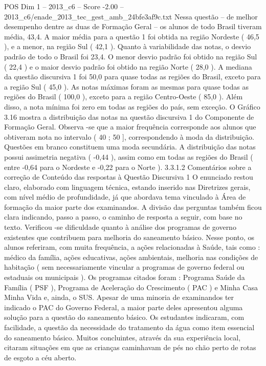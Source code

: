 \begin{textsample}{POS Dim 1 – 2013\_c6 – Score -2.00 – 2013\_c6/enade\_2013\_tec\_gest\_amb\_24bfe3af9c.txt}
Nessa questão – de melhor desempenho dentre as duas de Formação Geral – os alunos de todo Brasil tiveram média, 43,4.
A maior média para a questão 1 foi obtida na região Nordeste ( 46,5 ), e a menor, na região Sul ( 42,1 ).
Quanto à variabilidade das notas, o desvio padrão de todo o Brasil foi 23,4.
O menor desvio padrão foi obtido na região Sul ( 22,4 ) e o maior desvio padrão foi obtido na região Norte ( 28,0 ).
A mediana da questão discursiva 1 foi 50,0 para quase todas as regiões do Brasil, exceto para a região Sul ( 45,0 ).
As notas máximas foram as mesmas para quase todas as regiões do Brasil ( 100,0 ), exceto para a região Centro-Oeste ( 85,0 ).
Além disso, a nota mínima foi zero em todas as regiões do país, sem exceção.
O Gráfico 3.16 mostra a distribuição das notas na questão discursiva 1 do Componente de Formação Geral.
Observa -se que a maior frequência corresponde aos alunos que obtiveram nota no intervalo ( 40 ; 50 ], correspondendo à moda da distribuição.
Questões em branco constituem uma moda secundária.
A distribuição das notas possui assimetria negativa ( -0,44 ), assim como em todas as regiões do Brasil ( entre -0,64 para o Nordeste e -0,22 para o Norte ). 3.3.1.2 Comentários sobre a correção de Conteúdo das respostas à Questão Discursiva 1 O enunciado restou claro, elaborado com linguagem técnica, estando inserido nas Diretrizes gerais, com nível médio de profundidade, já que abordava tema vinculado à Área de formação da maior parte dos examinandos.
A divisão das perguntas também ficou clara indicando, passo a passo, o caminho de resposta a seguir, com base no texto.
Verificou -se dificuldade quanto à análise dos programas de governo existentes que contribuem para melhoria do saneamento básico.
Nesse ponto, os alunos referiram, com muita frequência, a ações relacionadas à Saúde, tais como : médico da família, ações educativas, ações ambientais, melhoria nas condições de habitação ( sem necessariamente vincular a programas de governo federal ou estaduais ou municipais ).
Os programas citados foram : Programa Saúde da Família ( PSF ), Programa de Aceleração do Crescimento ( PAC ) e Minha Casa Minha Vida e, ainda, o SUS.
Apesar de uma minoria de examinandos ter indicado o PAC do Governo Federal, a maior parte deles apresentou alguma solução para a questão do saneamento básico.
Os estudantes indicaram, com facilidade, a questão da necessidade do tratamento da água como item essencial do saneamento básico.
Muitos concluintes, através da sua experiência local, citaram situações em que as crianças caminhavam de pés no chão perto de rotas de esgoto a céu aberto.

\end{textsample}
